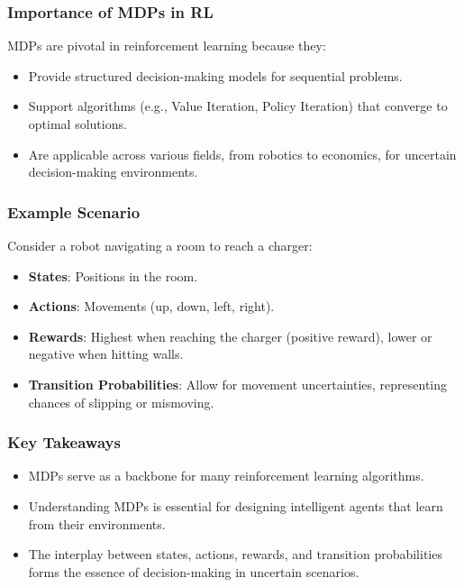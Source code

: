 \documentclass[aspectratio=169]{beamer}
\begin{document}
\begin{frame}[fragile]
    \frametitle{Importance of MDPs in RL}
    MDPs are pivotal in reinforcement learning because they:
    \begin{itemize}
        \item Provide structured decision-making models for sequential problems.
        \item Support algorithms (e.g., Value Iteration, Policy Iteration) that converge to optimal solutions.
        \item Are applicable across various fields, from robotics to economics, for uncertain decision-making environments.
    \end{itemize}
\end{frame}

\begin{frame}[fragile]
    \frametitle{Example Scenario}
    Consider a robot navigating a room to reach a charger:
    \begin{itemize}
        \item \textbf{States}: Positions in the room.
        \item \textbf{Actions}: Movements (up, down, left, right).
        \item \textbf{Rewards}: Highest when reaching the charger (positive reward), lower or negative when hitting walls.
        \item \textbf{Transition Probabilities}: Allow for movement uncertainties, representing chances of slipping or mismoving.
    \end{itemize}
\end{frame}

\begin{frame}[fragile]
    \frametitle{Key Takeaways}
    \begin{itemize}
        \item MDPs serve as a backbone for many reinforcement learning algorithms.
        \item Understanding MDPs is essential for designing intelligent agents that learn from their environments.
        \item The interplay between states, actions, rewards, and transition probabilities forms the essence of decision-making in uncertain scenarios.
    \end{itemize}
\end{frame}
\end{document}
